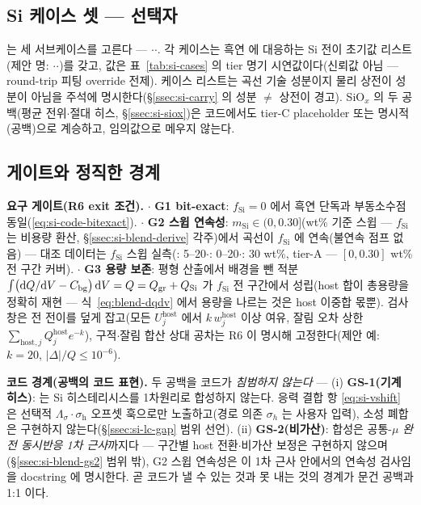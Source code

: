 \subsection{Si 케이스 셋 ---  선택자}\label{ssec:code-caseset}
 는 세 서브케이스를 고른다 --- $\cdot$$\cdot$.
각 케이스는 흑연  에 대응하는 Si 전이 초기값 리스트(제안 명:
$\cdot$$\cdot$)를 갖고, 값은 표~\ref{tab:si-cases}
의 tier 명기 시연값이다(신뢰값 아님 --- round-trip 피팅 override 전제). 케이스 리스트는 곡선 기술
성분이지 물리 상전이 성분이 아님을 주석에 명시한다(\S\ref{ssec:si-carry} 의 성분 $\ne$ 상전이 경고).
SiO$_x$ 의 두 공백(평균 전위$\cdot$절대 히스, \S\ref{ssec:si-siox})은 코드에서도 tier-C placeholder
또는 명시적 (공백)으로 계승하고, 임의값으로 메우지 않는다.

\subsection{게이트와 정직한 경계}\label{ssec:code-gates}
\begin{codebox}
\textbf{요구 게이트(R6 exit 조건).}
$\cdot$ \textbf{G1 bit-exact}: $f_\mathrm{Si}{=}0$ 에서 흑연 단독과 부동소수점 동일(\eqref{eq:si-code-bitexact}).
$\cdot$ \textbf{G2 스윕 연속성}: $m_\mathrm{Si}\in(0,0.30]$(wt\% 기준 스윕 --- $f_\mathrm{Si}$ 는 비용량 환산, \S\ref{ssec:si-blend-derive} 각주)에서 곡선이 $f_\mathrm{Si}$ 에 연속(불연속 점프 없음)
--- 대조 데이터는 $f_\mathrm{Si}$ 스윕 실측(\cite{gautam_blend2024}: 5--20$\cdot$\cite{moyassari_blend2022}: 0--20$\cdot$\cite{chatzogiannakis_blend2025}: 30 wt\%, tier-A --- $[0,0.30]$ wt\% 전 구간 커버).
$\cdot$ \textbf{G3 용량 보존}: 평형 산출에서 배경을 뺀 적분
$\int\bigl(\mathrm{d} Q/\mathrm{d} V-C_{\mathrm{bg}}\bigr)\,\mathrm{d} V=Q=Q_\mathrm{gr}+Q_\mathrm{Si}$ 가 $f_\mathrm{Si}$
전 구간에서 성립(host 합이 총용량을 정확히 재현 --- 식~\eqref{eq:blend-dqdv} 에서 용량을 나르는 것은
host 이중합 몫뿐). 검사 창은 전 전이를 덮게 잡고(모든 $U_j^\mathrm{host}$ 에서 $k\,w_j^\mathrm{host}$
이상 여유, 잘림 오차 상한 $\sum_{\mathrm{host},j}Q_j^\mathrm{host}e^{-k}$), 구적$\cdot$잘림 합산 상대
공차는 R6 이 명시해 고정한다(제안 예: $k{=}20$, $|\Delta|/Q\le10^{-6}$).
\end{codebox}

\begin{warnbox}
\textbf{코드 경계(공백의 코드 표현).} 두 공백을 코드가 \emph{침범하지 않는다} --- (i) \textbf{GS-1(기계
히스)}:  는 Si 히스테리시스를 1차원리로 합성하지 않는다. 응력 결합 항
\eqref{eq:si-vshift} 은 선택적 $\Lambda_\sigma\!\cdot\!\sigma_\mathrm{h}$ 오프셋 훅으로만 노출하고(경로 의존 $\sigma_h$
는 사용자 입력), 소성 폐합은 구현하지 않는다(\S\ref{ssec:si-lc-gap} 범위 선언). (ii) \textbf{GS-2(비가산)}:
합성은 공통-$\mu$ \emph{완전 동시반응 1차 근사}까지다 --- 구간별 host 전환$\cdot$비가산 보정은 구현하지
않으며(\S\ref{ssec:si-blend-gs2} 범위 밖), G2 스윕 연속성은 이 1차 근사 안에서의 연속성 검사임을 docstring
에 명시한다. 곧 코드가 낼 수 있는 것과 못 내는 것의 경계가 문건 공백과 1:1 이다.
\end{warnbox}

